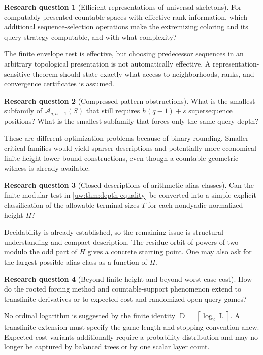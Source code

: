 \documentclass[11pt,letterpaper]{article}
\numberwithin{equation}{section}
\theoremstyle{definition}
\theoremstyle{remark}
\theoremstyle{definition}
\newtheorem{question}{Research question}
\newcommand{\ceil}[1]{\left\lceil#1\right\rceil}
\newcommand{\A}{\mathcal A}
\newcommand{\depth}{\operatorname{D}}
\newcommand{\layers}{\operatorname{L}}
\begin{document}
\begin{question}[Efficient representations of universal skeletons]\label{uw:q:effective}
For computably presented countable spaces with effective rank information,
which additional sequence-selection operations make the extremizing coloring
and its query strategy computable, and with what complexity?
\end{question}
The finite envelope test is effective, but choosing predecessor sequences in
an arbitrary topological presentation is not automatically effective. A
representation-sensitive theorem should state exactly what access to
neighborhoods, ranks, and convergence certificates is assumed.

\begin{question}[Compressed pattern obstructions]\label{uw:q:compressed}
What is the smallest subfamily of $\A_{q,h+1}(S)$ that still requires
$h(q-1)+s$ supersequence positions? What is the smallest subfamily that forces
only the same query depth?
\end{question}
These are different optimization problems because of binary rounding.
Smaller critical families would yield sparser descriptions and potentially
more economical finite-height lower-bound constructions, even though a
countable geometric witness is already available.

\begin{question}[Closed descriptions of arithmetic alias classes]\label{uw:q:aliases}
Can the finite modular test in \cref{uw:thm:depth-equality} be converted into a
simple explicit classification of the allowable terminal sizes $T$ for each
nondyadic normalized height $H$?
\end{question}
Decidability is already established, so the remaining issue is structural
understanding and compact description. The residue orbit of powers of two
modulo the odd part of $H$ gives a concrete starting point. One may also ask
for the largest possible alias class as a function of $H$.

\begin{question}[Beyond finite height and beyond worst-case cost]\label{uw:q:beyond}
How do the rooted forcing method and countable-support phenomenon extend to
transfinite derivatives or to expected-cost and randomized open-query games?
\end{question}
No ordinal logarithm is suggested by the finite identity
$\depth=\ceil{\log_2\layers}$. A transfinite extension must specify the game length
and stopping convention anew. Expected-cost variants additionally require a
probability distribution and may no longer be captured by balanced trees or
by one scalar layer count.
\end{document}
